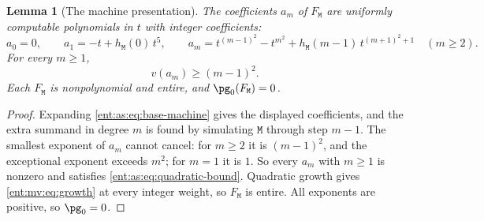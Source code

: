 \documentclass[11pt]{article}
\theoremstyle{plain}
\newtheorem{lemma}[lemma]{Lemma}
\theoremstyle{plain}
\theoremstyle{plain}
\theoremstyle{definition}
\theoremstyle{definition}
\theoremstyle{definition}
\theoremstyle{definition}
\theoremstyle{remark}
\begin{document}
\begin{lemma}[The machine presentation]\label{ent:as:lem:machine}
The coefficients $a_m$ of $F_{\mathtt M}$ are uniformly computable
polynomials in $t$ with integer coefficients:
\begin{equation}\label{ent:as:eq:machine-coefficients}
 a_0=0,\qquad a_1=-t+h_{\mathtt M}(0)\,t^5,\qquad
 a_m=t^{(m-1)^2}-t^{m^2}+h_{\mathtt M}(m-1)\,t^{(m+1)^2+1}\quad(m\ge2).
\end{equation}
For every $m\ge1$,
\begin{equation}\label{ent:as:eq:quadratic-bound}
 v(a_m)\ge(m-1)^2 .
\end{equation}
Each $F_{\mathtt M}$ is nonpolynomial and entire, and $\pg_0(F_{\mathtt M})=0$.
\end{lemma}
\begin{proof}
Expanding \eqref{ent:as:eq:base-machine} gives the displayed coefficients, and
the extra summand in degree $m$ is found by simulating $\mathtt M$ through step
$m-1$. The smallest exponent of $a_m$ cannot cancel: for $m\ge2$ it is
$(m-1)^2$, and the exceptional exponent exceeds $m^2$; for $m=1$ it is $1$. So
every $a_m$ with $m\ge1$ is nonzero and satisfies
\eqref{ent:as:eq:quadratic-bound}. Quadratic growth gives
\eqref{ent:mv:eq:growth} at every integer weight, so $F_{\mathtt M}$ is entire.
All exponents are positive, so $\pg_0=0$.
\end{proof}
\end{document}
